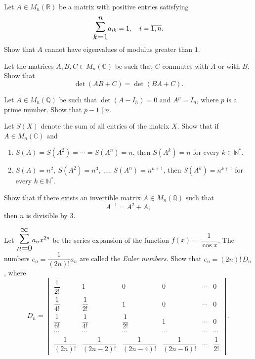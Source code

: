 \documentclass[12pt]{article}
\let\oldsum\sum
\renewcommand{\sum}{\mathlarger{\mathlarger{\oldsum}}}
\begin{document}
\begin{problem}
Let $A \in M_n(\mathbb{R})$ be a matrix with positive entries satisfying
$$\sum_{k=1}^{n} a_{ik} = 1, \quad i = \overline{1,n}.$$
Show that $A$ cannot have eigenvalues of modulus greater than $1$.
\end{problem}

\begin{problem}
Let the matrices $A, B, C \in M_n(\mathbb{C})$ be such that $C$ commutes with $A$ or with $B$. Show that
$$\det(AB + C) = \det(BA + C).$$
\end{problem}

\begin{problem}
Let $A \in M_n(\mathbb{Q})$ be such that $\det(A - I_n) = 0$ and $A^p = I_n$, where $p$ is a prime number. Show that $p - 1 \mid n$.
\end{problem}

\begin{problem}
Let $S(X)$ denote the sum of all entries of the matrix $X$. Show that if $A \in M_n(\mathbb{C})$ and
\begin{enumerate}[label=(\alph*)]
\item $S(A) = S(A^2) = \cdots = S(A^n) = n$, then $S(A^k) = n$ for every $k \in \mathbb{N}^*$.
\item $S(A) = n^2,\ S(A^2) = n^3,\ \ldots,\ S(A^n) = n^{n+1}$, then $S(A^k) = n^{k+1}$ for every $k \in \mathbb{N}^*$.
\end{enumerate}
\end{problem}

\begin{problem}
Show that if there exists an invertible matrix $A \in M_n(\mathbb{Q})$ such that
$$A^{-1} = A^2 + A,$$
then $n$ is divisible by $3$.
\end{problem}

\begin{problem}
Let $\displaystyle\sum_{n=0}^{\infty} a_n x^{2n}$ be the series expansion of the function $f(x) = \dfrac{1}{\cos x}$. The numbers $e_n = \dfrac{1}{(2n)!} a_n$ are called the \emph{Euler numbers}. Show that $e_n = (2n)!\, D_n$, where
$$D_n = \begin{vmatrix}
\dfrac{1}{2!} & 1 & 0 & 0 & \cdots & 0 \\[6pt]
\dfrac{1}{4!} & \dfrac{1}{2!} & 1 & 0 & \cdots & 0 \\[6pt]
\dfrac{1}{6!} & \dfrac{1}{4!} & \dfrac{1}{2!} & 1 & \cdots & 0 \\[6pt]
\cdots & \cdots & \cdots & \cdots & \cdots & \cdots \\[6pt]
\dfrac{1}{(2n)!} & \dfrac{1}{(2n-2)!} & \dfrac{1}{(2n-4)!} & \dfrac{1}{(2n-6)!} & \cdots & \dfrac{1}{2!}
\end{vmatrix}.$$
\end{problem}
\end{document}
